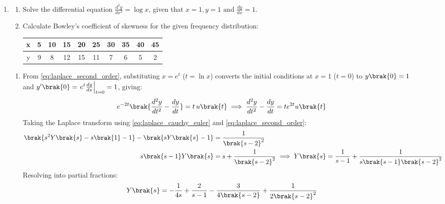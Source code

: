 \begin{enumerate}[label=\thesubsection.\arabic*, ref=\thesubsection.\theenumi]
\begin{enumerate}[label=\brak{\alph*}]
\begin{figure}[H]
			The following code verifies the result.
			\noindent{}
		\end{figure}
	\end{enumerate}
	
	\item \hfill {}
	\begin{enumerate}[label=\brak{\alph*}]
		\item Solve the differential equation $\frac{d^2y}{dx^2} = \log x$, given that $x=1, y=1 \text{ and } \frac{dy}{dx} = 1$.
		\item Calculate Bowley's coefficient of skewness for the given frequency distribution:
		\begin{center}
			\begin{tabular}{|c|c|c|c|c|c|c|c|c|c|}
				\hline
				x & 5 & 10 & 15 & 20 & 25 & 30 & 35 & 40 & 45 \\ \hline
				y & 9 & 8 & 12 & 15 & 11 & 7 & 6 & 5 & 2 \\ \hline
			\end{tabular}
		\end{center}
	\end{enumerate}
	\solution
	\begin{enumerate}[label=\brak{\alph*}]
		\item From \eqref{eq:laplace_second_order}, substituting $x = e^t$ ($t = \ln x$) converts the initial conditions at $x = 1$ ($t = 0$) to $y\brak{0} = 1$ and $y'\brak{0} = \left.e^t\frac{dy}{dx}\right|_{t=0} = 1$, giving:
		\begin{align}
			e^{-2t}\brak{\frac{d^2y}{dt^2} - \frac{dy}{dt}} = t\,u\brak{t} \implies \frac{d^2y}{dt^2} - \frac{dy}{dt} = t e^{2t} u\brak{t}
		\end{align}
		Taking the Laplace transform using \eqref{eq:laplace_cauchy_euler} and \eqref{eq:laplace_second_order}:
		\begin{align}
			\brak{s^2 Y\brak{s} - s\brak{1} - 1} - \brak{s Y\brak{s} - 1} &= \frac{1}{\brak{s-2}^2} \\
			s\brak{s-1}Y\brak{s} &= s + \frac{1}{\brak{s-2}^2} \implies Y\brak{s} = \frac{1}{s-1} + \frac{1}{s\brak{s-1}\brak{s-2}^2}
		\end{align}
		Resolving into partial fractions:
		\begin{align}
			Y\brak{s} = -\frac{1}{4s} + \frac{2}{s-1} - \frac{3}{4\brak{s-2}} + \frac{1}{2\brak{s-2}^2}
		\end{align}

\end{enumerate}
\end{enumerate}
